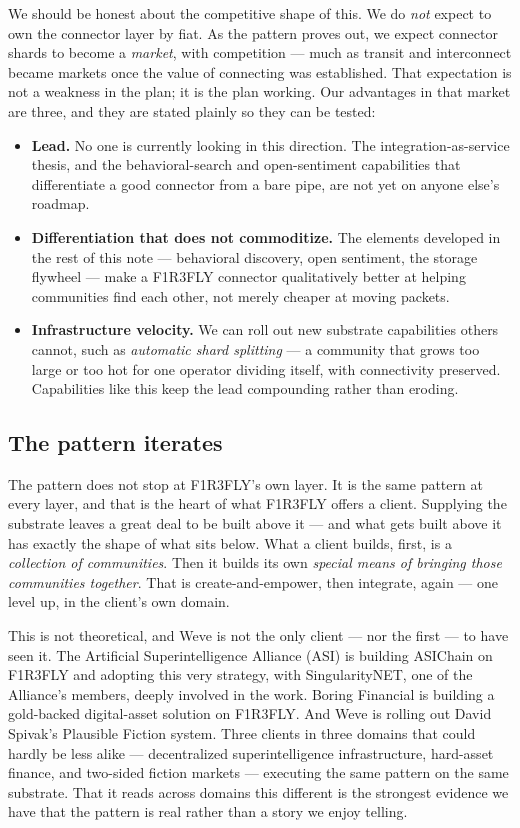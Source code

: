 \documentclass[11pt]{article}
\begin{document}
We should be honest about the competitive shape of this. We do \emph{not} expect to own the connector layer by fiat. As the pattern proves out, we expect connector shards to become a \emph{market}, with competition --- much as transit and interconnect became markets once the value of connecting was established. That expectation is not a weakness in the plan; it is the plan working. Our advantages in that market are three, and they are stated plainly so they can be tested:

\begin{itemize}[leftmargin=1.4em, itemsep=4pt]
  \item \textbf{Lead.} No one is currently looking in this direction. The integration-as-service thesis, and the behavioral-search and open-sentiment capabilities that differentiate a good connector from a bare pipe, are not yet on anyone else's roadmap.
  \item \textbf{Differentiation that does not commoditize.} The elements developed in the rest of this note --- behavioral discovery, open sentiment, the storage flywheel --- make a F1R3FLY connector qualitatively better at helping communities find each other, not merely cheaper at moving packets.
  \item \textbf{Infrastructure velocity.} We can roll out new substrate capabilities others cannot, such as \emph{automatic shard splitting} --- a community that grows too large or too hot for one operator dividing itself, with connectivity preserved. Capabilities like this keep the lead compounding rather than eroding.
\end{itemize}

\subsection*{The pattern iterates}

The pattern does not stop at F1R3FLY's own layer. It is the same pattern at every layer, and that is the heart of what F1R3FLY offers a client. Supplying the substrate leaves a great deal to be built above it --- and what gets built above it has exactly the shape of what sits below. What a client builds, first, is a \emph{collection of communities}. Then it builds its own \emph{special means of bringing those communities together}. That is create-and-empower, then integrate, again --- one level up, in the client's own domain.

This is not theoretical, and Weve is not the only client --- nor the first --- to have seen it. The Artificial Superintelligence Alliance (ASI) is building ASIChain on F1R3FLY and adopting this very strategy, with SingularityNET, one of the Alliance's members, deeply involved in the work. Boring Financial is building a gold-backed digital-asset solution on F1R3FLY. And Weve is rolling out David Spivak's Plausible Fiction system. Three clients in three domains that could hardly be less alike --- decentralized superintelligence infrastructure, hard-asset finance, and two-sided fiction markets --- executing the same pattern on the same substrate. That it reads across domains this different is the strongest evidence we have that the pattern is real rather than a story we enjoy telling.
\end{document}

